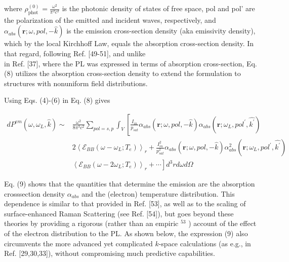 \documentclass[10pt]{article}
\begin{document}
where $\rho_{\text {phot }}^{(0)}=\frac{\omega^{2}}{\pi^{2} c^{2}}$ is the photonic density of states of free space, pol and pol' are the polarization of the emitted and incident waves, respectively, and $\alpha_{a b s}(\mathbf{r} ; \omega, p o l,-\hat{k})$ is the emission cross-section density (aka emissivity density), which by the local Kirchhoff Law, equals the absorption cross-section density. In that regard, following Ref. [49-51], and unlike\\[0pt]
in Ref. [37], where the PL was expressed in terms of absorption cross-section, Eq. (8) utilizes the absorption cross-section density to extend the formulation to structures with nonuniform field distributions.

Using Eqs. (4)-(6) in Eq. (8) gives


\begin{align*}
d P^{e m}\left(\omega, \omega_{L}, \hat{k}\right) \sim & \frac{\omega^{2}}{8 \pi^{3} c^{2}} \sum_{p o l=s, p} \int_{V}\left[\frac{I_{i n}}{p_{s a t}} \alpha_{a b s}(\mathbf{r} ; \omega, p o l,-\hat{k}) \alpha_{a b s}\left(\mathbf{r} ; \omega_{L}, p o l^{\prime}, \hat{k^{\prime}}\right)\right. \\
& 2\left\langle\mathcal{E}_{B B}\left(\omega-\omega_{L} ; T_{e}\right)\right\rangle_{r}+\frac{I_{i n}^{2}}{p_{s a t}^{2}} \alpha_{a b s}(\mathbf{r} ; \omega, p o l,-\hat{k}) \alpha_{a b s}^{2}\left(\mathbf{r} ; \omega_{L}, p o l^{\prime}, \hat{k^{\prime}}\right) \\
& \left.\left\langle\mathcal{E}_{B B}\left(\omega-2 \omega_{L} ; T_{e}\right)\right\rangle_{r}+\cdots\right] d^{3} r d \omega d \Omega \tag{9}
\end{align*}


Eq. (9) shows that the quantities that determine the emission are the absorption crosssection density $\alpha_{a b s}$ and the (electron) temperature distribution. This dependence is similar to that provided in Ref. [53], as well as to the scaling of surface-enhanced Raman Scattering (see Ref. [54]), but goes beyond these theories by providing a rigorous (rather than an empiric ${ }^{53}$ ) account of the effect of the electron distribution to the PL. As shown below, the expression (9) also circumvents the more advanced yet complicated $k$-space calculations (as e.g., in Ref. [29,30,33]), without compromising much predictive capabilities.
\end{document}
